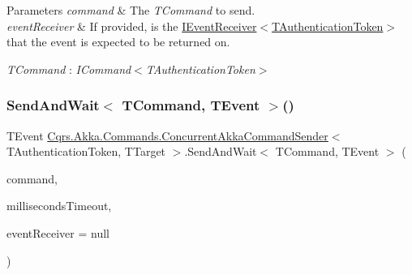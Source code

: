 \begin{DoxyParams}{Parameters}
{\em command} & The {\itshape T\+Command}  to send.\\
\hline
{\em event\+Receiver} & If provided, is the \hyperlink{interfaceCqrs_1_1Events_1_1IEventReceiver}{I\+Event\+Receiver$<$\+T\+Authentication\+Token$>$} that the event is expected to be returned on.\\
\hline
\end{DoxyParams}
\begin{Desc}
\item[Type Constraints]\begin{description}
\item[{\em T\+Command} : {\em I\+Command$<$T\+Authentication\+Token$>$}]\end{description}
\end{Desc}
\mbox{\label{classCqrs_1_1Akka_1_1Commands_1_1ConcurrentAkkaCommandSender_a171974eb1ba3eb7be9816bd7927227ac_a171974eb1ba3eb7be9816bd7927227ac}} 
\subsubsection{\texorpdfstring{Send\+And\+Wait$<$ T\+Command, T\+Event $>$()}{SendAndWait< TCommand, TEvent >()}\hspace{0.1cm}{\footnotesize\ttfamily [2/6]}}
{\footnotesize\ttfamily T\+Event \hyperlink{classCqrs_1_1Akka_1_1Commands_1_1ConcurrentAkkaCommandSender}{Cqrs.\+Akka.\+Commands.\+Concurrent\+Akka\+Command\+Sender}$<$ T\+Authentication\+Token, T\+Target $>$.Send\+And\+Wait$<$ T\+Command, T\+Event $>$ (\begin{DoxyParamCaption}\item[{T\+Command}]{command,  }\item[{int}]{milliseconds\+Timeout,  }\item[{\hyperlink{interfaceCqrs_1_1Events_1_1IEventReceiver}{I\+Event\+Receiver}$<$ T\+Authentication\+Token $>$}]{event\+Receiver = {\ttfamily null} }\end{DoxyParamCaption})}



